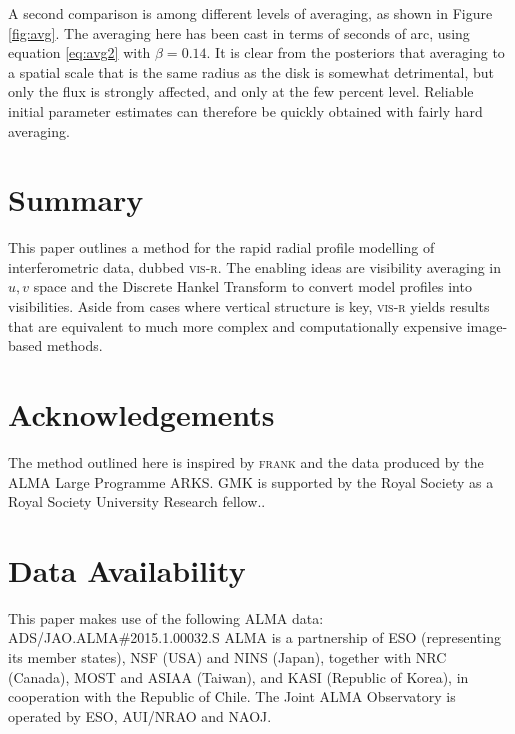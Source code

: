 \documentclass[fleqn,usenatbib]{mnras}
\begin{document}
A second comparison is among different levels of averaging, as shown in Figure \ref{fig:avg}. The averaging here has been cast in terms of seconds of arc, using equation \ref{eq:avg2} with $\beta=0.14$. It is clear from the posteriors that averaging to a spatial scale that is the same radius as the disk is somewhat detrimental, but only the flux is strongly affected, and only at the few percent level. Reliable initial parameter estimates can therefore be quickly obtained with fairly hard averaging.

\section{Summary}

This paper outlines a method for the rapid radial profile modelling of interferometric data, dubbed \textsc{vis-r}. The enabling ideas are visibility averaging in $u,v$ space and the Discrete Hankel Transform to convert model profiles into visibilities. Aside from cases where vertical structure is key, \textsc{vis-r} yields results that are equivalent to much more complex and computationally expensive image-based methods.

\section*{Acknowledgements}

The method outlined here is inspired by \textsc{frank} \citep{2020MNRAS.tmp.1491J} and the data produced by the ALMA Large Programme ARKS. GMK is supported by the Royal Society as a Royal Society University Research fellow..

\section*{Data Availability}

This paper makes use of the following ALMA data: ADS/JAO.ALMA\#2015.1.00032.S ALMA is a partnership of ESO (representing its member states), NSF (USA) and NINS (Japan), together with NRC (Canada), MOST and ASIAA (Taiwan), and KASI (Republic of Korea), in cooperation with the Republic of Chile. The Joint ALMA Observatory is operated by ESO, AUI/NRAO and NAOJ.




\end{document}
